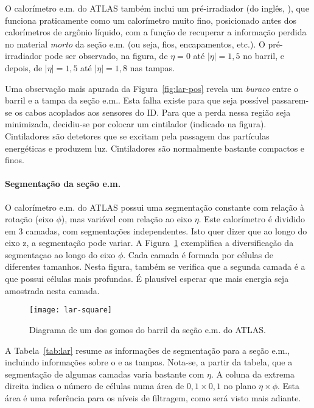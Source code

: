 O calo\-rí\-metro e.m. do ATLAS tam\-bém inclui um pré-irradiador (do inglês,
), que funciona praticamente como um calo\-rí\-metro muito
fino, posicionado antes dos calo\-rí\-metros de ar\-gô\-nio lí\-quido, com a
função de recuperar a informação perdida no material \textit{morto} da seção
e.m. (ou seja, fios, encapamentos, etc.). O pré-irradiador pode ser observado,
na figura, de $\eta=0$ até $|\eta|=1,5$ no barril, e depois, de $|\eta|=1,5$
até $|\eta|=1,8$ nas tampas.

Uma observação mais apurada da Figura~\ref{fig:lar-pos} revela um
\textit{buraco} entre o barril e a tampa da seção e.m.. Esta falha existe para
que seja possível passarem-se os cabos acoplados aos sensores do ID. Para que
a perda nessa região seja minimizada, decidiu-se por colocar um cintilador
(indicado na figura). Cintiladores são detetores que se excitam pela passagem
das partículas energéticas e produzem luz. Cintiladores são normalmente
bastante compactos e finos.

\paragraph{Segmentação da seção e.m.} O calorímetro e.m. do ATLAS possui
uma segmentação constante com relação à rotação (eixo $\phi$), mas variável
com relação ao eixo $\eta$. Este calorímetro é dividido em 3 camadas, com
segmentações independentes. Isto quer dizer que ao longo do eixo z, a
segmentação pode variar. A Figura~\ref{fig:lar-detail} exemplifica a
diversificação da segmentaçao ao longo do eixo $\phi$. Cada camada é formada
por células de diferentes tamanhos. Nesta figura, também se verifica que a
segunda camada é a que possui células mais profundas. É plausível esperar que
mais energia seja amostrada nesta camada.

\begin{figure}
\begin{center}
\texttt{[image: lar-square]}
\end{center}
\caption{Diagrama de um dos gomos do barril da seção e.m. do ATLAS.}
\label{fig:lar-detail}
\end{figure}

A Tabela~\ref{tab:lar} resume as informações de segmentação para a seção e.m.,
incluindo informações sobre o  e as tampas. Nota-se, a partir
da tabela, que a segmentação de algumas camadas varia bastante com $\eta$. A
coluna da extrema direita indica o número de células numa área de
$0,1\times0,1$ no plano $\eta\times\phi$. Esta área é uma referência para os
níveis de filtragem, como será visto mais adiante.

